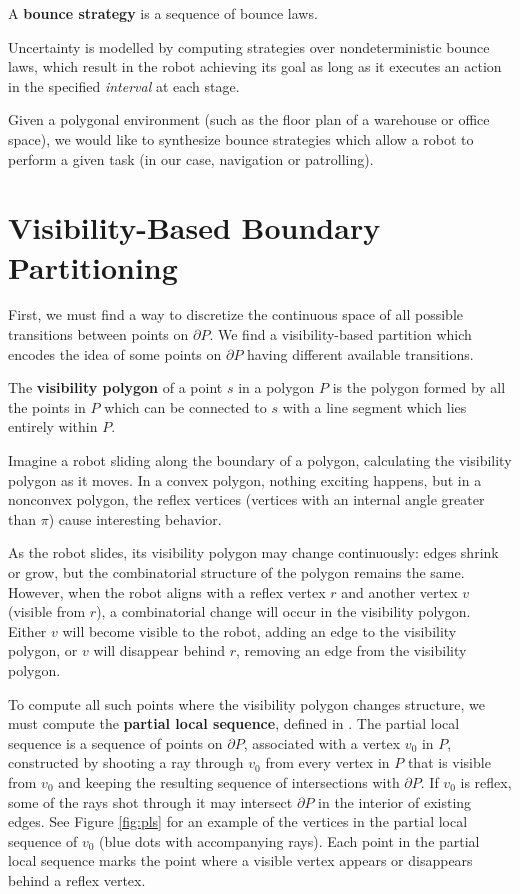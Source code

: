 \documentclass[]{styles/svproc}  %
\begin{document}
\begin{definition}
A \textbf{bounce strategy} is a sequence of bounce laws.
\end{definition}

Uncertainty is modelled by computing strategies over nondeterministic bounce
laws, which result in the robot achieving its goal as long as it executes an
action in the specified \emph{interval} at each stage.

Given a polygonal environment (such as the floor plan of a warehouse or office
space), we would like to synthesize bounce strategies which allow a robot to
perform a given task (in our case, navigation or patrolling).



\section{Visibility-Based Boundary Partitioning} \label{sec:partition}

First, we must find a way to discretize the continuous space of all possible
transitions between points on $\partial P$. We find a visibility-based partition
which encodes the idea of some points on $\partial P$ having different
available transitions.

\begin{definition}
The \textbf{visibility polygon} of a point $s$ in a polygon $P$ is the polygon
formed by all the points in $P$ which can be connected to $s$ with a line
segment which lies entirely within $P$.
\end{definition}

Imagine a robot sliding along the boundary of a polygon, calculating 
the visibility polygon as it moves. In a convex polygon, nothing exciting 
happens, but in a nonconvex polygon, the reflex vertices (vertices with an
internal angle greater than $\pi$) cause interesting
behavior.

As the robot slides, its visibility polygon may change continuously: edges
shrink or grow, but the combinatorial structure of the polygon remains the same.
However, when the robot aligns with a reflex vertex $r$ and another vertex $v$ (visible
from $r$), a combinatorial change will occur in the visibility polygon. Either 
$v$ will become visible to the robot, adding an edge to the visibility 
polygon, or $v$ will disappear behind $r$, removing an edge from the visibility polygon.

To compute all such points where the visibility polygon changes structure, we
must compute the \textbf{partial local sequence}, defined in \cite{rourke_viz}.
The partial local sequence is a sequence of points on $\partial P$, associated with 
a vertex $v_0$ in $P$, constructed by shooting a ray through $v_0$ from every vertex in $P$
that is visible from $v_0$ and keeping the resulting sequence of intersections with
$\partial P$. If $v_0$ is reflex, some of the rays shot through it may intersect
$\partial P$ in the interior of existing edges. See Figure \ref{fig:pls} for an
example of the vertices in the partial local sequence of $v_0$ (blue dots with
accompanying rays). Each point in the partial local sequence marks the point
where a visible vertex appears or disappears behind a reflex vertex.
\end{document}
